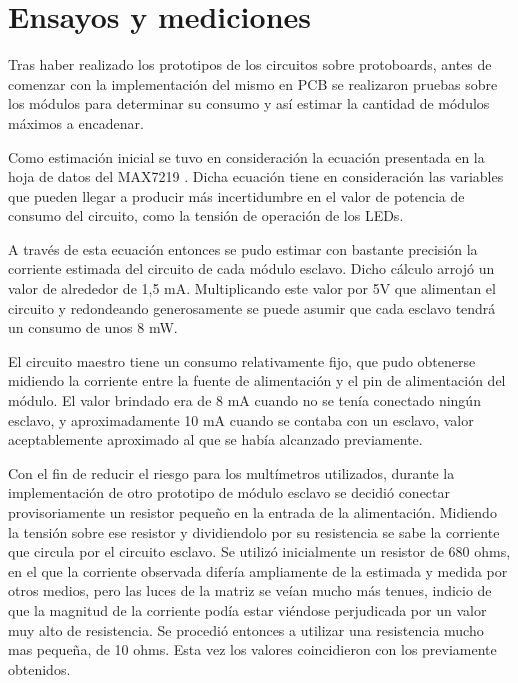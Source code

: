 \clearpage



\clearpage
\part{Ensayos y mediciones}\label{part:ensayos}

Tras haber realizado los prototipos de los circuitos sobre protoboards, antes de comenzar con la implementación del mismo en PCB se realizaron pruebas sobre los módulos para determinar su consumo y así estimar la cantidad de módulos máximos a encadenar.

Como estimación inicial se tuvo en consideración la ecuación presentada en la hoja de datos del MAX7219 \cite{MAX7219}. Dicha ecuación tiene en consideración las variables que pueden llegar a producir más incertidumbre en el valor de potencia de consumo del circuito, como la tensión de operación de los LEDs.

A través de esta ecuación entonces se pudo estimar con bastante precisión la corriente estimada del circuito de cada módulo esclavo. Dicho cálculo arrojó un valor de alrededor de 1,5 mA. Multiplicando este valor por 5V que alimentan el circuito y redondeando generosamente se puede asumir que cada esclavo tendrá un consumo de unos 8 mW.

El circuito maestro tiene un consumo relativamente fijo, que pudo obtenerse midiendo la corriente entre la fuente de alimentación y el pin de alimentación del módulo. El valor brindado era de 8 mA cuando no se tenía conectado ningún esclavo, y aproximadamente 10 mA cuando se contaba con un esclavo, valor aceptablemente aproximado al que se había alcanzado previamente.

Con el fin de reducir el riesgo para los multímetros utilizados, durante la implementación de otro prototipo de módulo esclavo se decidió conectar provisoriamente un resistor pequeño en la entrada de la alimentación. Midiendo la tensión sobre ese resistor y dividiendolo por su resistencia se sabe la corriente que circula por el circuito esclavo. Se utilizó inicialmente un resistor de 680 ohms, en el que la corriente observada difería ampliamente de la estimada y medida por otros medios, pero las luces de la matriz se veían mucho más tenues, indicio de que la magnitud de la corriente podía estar viéndose perjudicada por un valor muy alto de resistencia. Se procedió entonces a utilizar una resistencia mucho mas pequeña, de 10 ohms. Esta vez los valores coincidieron con los previamente obtenidos.

